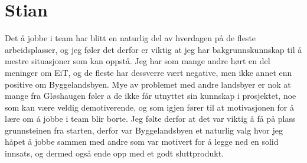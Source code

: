 \section{Stian}
Det å jobbe i team har blitt en naturlig del av hverdagen på de fleste arbeidsplasser, 
og jeg føler det derfor er viktig at jeg har bakgrunnskunnskap til å mestre situasjoner som kan oppstå. 
Jeg har som mange andre hørt en del meninger om EiT, og de fleste har dessverre vært negative, 
men ikke annet enn positive om Byggelandsbyen. 
Mye av problemet med andre landsbyer er nok at mange fra Gløshaugen føler a de ikke får utnyttet sin kunnskap i prosjektet, 
noe som kan være veldig demotiverende, og som igjen fører til at motivasjonen for å lære om å jobbe i team blir borte. 
Jeg følte derfor at det var viktig å få  på plass grunnsteinen fra starten, 
derfor var Byggelandsbyen et naturlig valg hvor jeg håpet å jobbe sammen med andre som var motivert for å legge ned en solid innsats, 
og dermed også ende opp med et godt sluttprodukt.   

